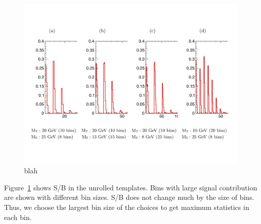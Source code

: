 \begin{figure}[htp]
	\centering
	\includegraphics[width=1.0\textwidth]{figures/binsize.pdf}
	\caption{ blah }
  	\label{fig:app_binsize}
\end{figure}

Figure~\ref{fig:app_binsize} shows S/B in the unrolled templates. 
Bins with large signal contribution are shown with different bin sizes. 
S/B does not change much by the size of bins.  
Thus, we choose the largest bin size of the choices to get maximum statistics in each bin.  
